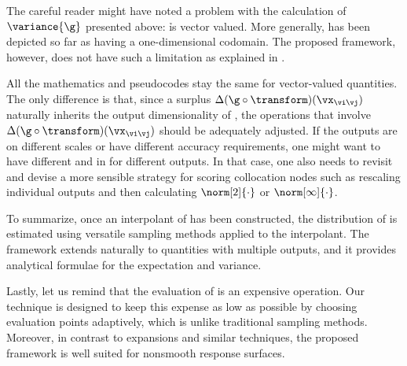 The careful reader might have noted a problem with the calculation of
$\variance{\g}$ presented above: \h is vector valued. More generally, \g has
been depicted so far as having a one-dimensional codomain. The proposed
framework, however, does not have such a limitation as explained in
.

\begin{remark} 
All the mathematics and pseudocodes stay the same for vector-valued quantities.
The only difference is that, since a surplus $\Delta(\g \circ
\transform)(\vx_{\vi \vj})$ naturally inherits the output dimensionality of \g,
the operations that involve $\Delta(\g \circ \transform)(\vx_{\vi \vj})$ should
be adequately adjusted. If the outputs are on different scales or have different
accuracy requirements, one might want to have different  and 
in  for different outputs. In that case, one also needs
to revisit  and devise a more sensible strategy for
scoring collocation nodes such as rescaling individual outputs and then
calculating $\norm[2]{\cdot}$ or $\norm[\infty]{\cdot}$.
\end{remark}

To summarize, once an interpolant of \g has been constructed, the distribution
of \g is estimated using versatile sampling methods applied to the interpolant.
The framework extends naturally to quantities with multiple outputs, and it
provides analytical formulae for the expectation and variance.

Lastly, let us remind that the evaluation of \g is an expensive operation. Our
technique is designed to keep this expense as low as possible by choosing
evaluation points adaptively, which is unlike traditional sampling methods.
Moreover, in contrast to  expansions and similar techniques, the proposed
framework is well suited for nonsmooth response surfaces.
